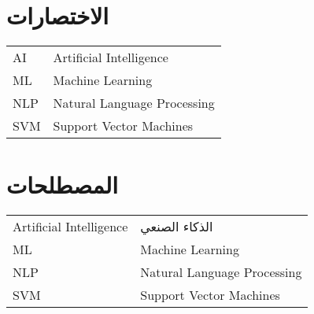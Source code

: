 

\chapter*{الاختصارات}

\begin{doublespacing}
	\begin{center}
		\begin{english}
			\begin{tabular}{l l}
				
				\indent
				AI		&		Artificial Intelligence \\
				
				\indent
				ML		&		Machine Learning \\
				
				\indent
				NLP		&		Natural Language Processing \\
				
				\indent
				SVM		&		Support Vector Machines \\
				
			\end{tabular}
		\end{english}
	\end{center}
\end{doublespacing}


\chapter*{المصطلحات}

\begin{doublespacing}
	\begin{center}
		\begin{english}
			\begin{tabular}{l l}
				
				\indent
				Artificial Intelligence		&		
				الذكاء الصنعي \\
				
				\indent
				ML		&		Machine Learning \\
				
				\indent
				NLP		&		Natural Language Processing \\
				
				\indent
				SVM		&		Support Vector Machines \\
				
			\end{tabular}
		\end{english}
	\end{center}
\end{doublespacing}

